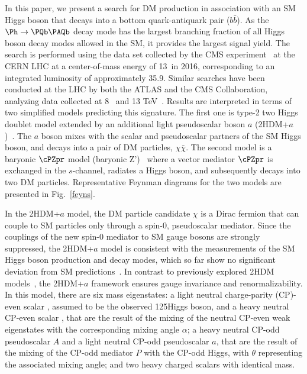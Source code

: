 In this paper, we  present a search for DM production in association
with an SM Higgs boson that decays into a bottom quark-antiquark pair ($b\bar{b}$). As the 
$\Ph\rightarrow \bb$ decay mode has the largest branching fraction of all Higgs boson decay modes allowed in the SM, it provides the largest signal yield. The search is performed using the data set collected by the CMS experiment~\cite{CMSdetector} at the CERN LHC at a center-of-mass energy of 13\TeV~in 2016, corresponding to an integrated luminosity of approximately 35.9\fbinv. 
Similar searches have been conducted at the LHC by both the ATLAS and the CMS Collaboration, analyzing data collected at 8~\cite{PhysRevLett.115.131801} and 13 TeV~\cite{PhysRevLett.119.181804,1807.02826}.
Results are interpreted in terms of two simplified models predicting this signature. The first one is type-2 two Higgs doublet model extended by an additional light pseudoscalar boson $a$ (2HDM+$a$)~\cite{Bauer2017}. The $a$ boson mixes with the scalar and pseudoscalar partners of the SM Higgs boson, and decays into a pair of DM particles,  $\chi\bar{\chi}$. The second model is a baryonic $\cPZpr$ model (baryonic Z')~\cite{PhysRevD.89.075017} where a vector mediator $\cPZpr$ is exchanged in the $s$-channel, radiates a Higgs boson, and subsequently decays into two DM 
particles. Representative Feynman diagrams for the two models are presented in Fig.~\ref{feyns}.


In the 2HDM+$a$ model, the DM particle candidate $\chi$ is a Dirac fermion that can couple to SM particles only through a spin-0, pseudoscalar mediator. Since the couplings of the new spin-0
mediator to SM gauge bosons are strongly suppressed, the 2HDM+$a$ model
is consistent with the measurements of the SM Higgs boson production and
decay modes, which so far show no significant deviation from SM predictions~\cite{Khachatryan:2016vau}. In contrast to previously explored 2HDM models~\cite{2HDM,Aaboud:2017yqz,Sirunyan:2017hnk}, the 2HDM+$a$ framework ensures gauge invariance and renormalizability. In this model, there are six mass eigenstates:
a light neutral charge-parity (CP)-even scalar \Ph, assumed to be the
observed 125\GeV Higgs boson, and a heavy neutral CP-even scalar \PH, that are the result of the mixing of the neutral CP-even weak eigenstates with the corresponding mixing angle $\alpha$;
a heavy neutral CP-odd pseudoscalar $A$%
and a light neutral CP-odd pseudoscalar $a$, that are the result of the mixing of the CP-odd mediator $P$ with the CP-odd Higgs, with $\theta$ representing the associated mixing angle; and two heavy charged scalars \Hpm with identical mass. 

